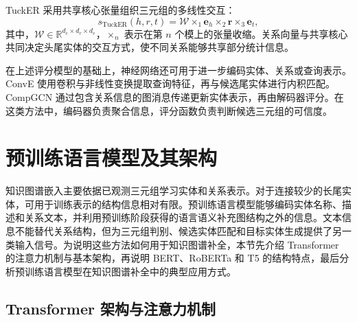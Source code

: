 TuckER 采用共享核心张量组织三元组的多线性交互\cite{TuckER_Balazevic_2019}：
\begin{equation}
    s_{\mathrm{TuckER}}(h,r,t)
    =\mathcal{W}\times_1\mathbf{e}_h
      \times_2\mathbf{r}\times_3\mathbf{e}_t,
\end{equation}
其中，$\mathcal{W}\in\mathbb{R}^{d_e\times d_r\times d_e}$，$\times_n$ 表示在第 $n$ 个模上的张量收缩。关系向量与共享核心共同决定头尾实体的交互方式，使不同关系能够共享部分统计信息。

在上述评分模型的基础上，神经网络还可用于进一步编码实体、关系或查询表示。ConvE 使用卷积与非线性变换提取查询特征，再与候选尾实体进行内积匹配\cite{dettmers2018conve}。CompGCN 通过包含关系信息的图消息传递更新实体表示，再由解码器评分\cite{vashishth2020composition}。在这类方法中，编码器负责聚合信息，评分函数负责判断候选三元组的可信度。


\section{预训练语言模型及其架构}

知识图谱嵌入主要依据已观测三元组学习实体和关系表示。对于连接较少的长尾实体，可用于训练表示的结构信息相对有限。预训练语言模型能够编码实体名称、描述和关系文本，并利用预训练阶段获得的语言语义补充图结构之外的信息。文本信息不能替代关系结构，但为三元组判别、候选实体匹配和目标实体生成提供了另一类输入信号。为说明这些方法如何用于知识图谱补全，本节先介绍 Transformer 的注意力机制与基本架构，再说明 BERT、RoBERTa 和 T5 的结构特点，最后分析预训练语言模型在知识图谱补全中的典型应用方式。
\subsection{Transformer 架构与注意力机制}


